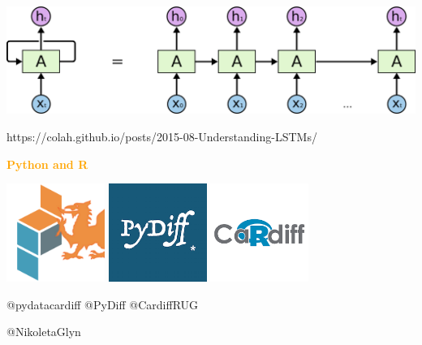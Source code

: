 \documentclass{beamer}
\begin{document}

\begin{frame}
    \begin{center}
    \includegraphics[width=\textwidth]{static/LSTM.png}\vspace{1cm}

    \small{https://colah.github.io/posts/2015-08-Understanding-LSTMs/}
    \end{center}
\end{frame}

\begin{frame}
    \begin{center}
    \Large \textcolor{orange}{\textbf{Python and R}}
    \end{center}
\end{frame}

\begin{frame}
    \begin{center}
    \includegraphics[width=0.24\textwidth]{static/pydata.jpeg}\hspace{15pt}
    \includegraphics[width=0.24\textwidth]{static/pydiff.png}\hspace{15pt}
    \includegraphics[width=0.24\textwidth]{static/R.png}

    @pydatacardiff \qquad \quad @PyDiff \qquad \qquad @CardiffRUG

    \vspace{1cm}
    @NikoletaGlyn
    \end{center}
\end{frame}
\end{document}
